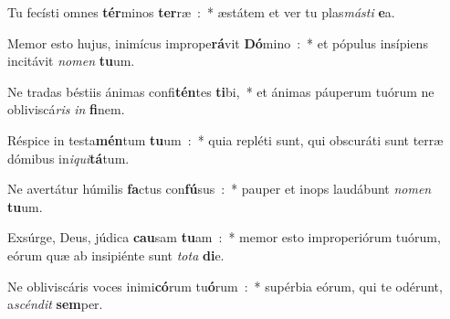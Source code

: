\item Tu fecísti omnes \textbf{tér}minos \textbf{ter}ræ~:~* æstátem et ver tu plas\emph{má}\emph{sti} \textbf{e}a.
\item Memor esto hujus, inimícus imprope\textbf{rá}vit \textbf{Dó}mino~:~* et pópulus insípiens incitávit \emph{no}\emph{men} \textbf{tu}um.
\item Ne tradas béstiis ánimas confi\textbf{tén}tes \textbf{ti}bi,~* et ánimas páuperum tuórum ne obliviscá\emph{ris} \emph{in} \textbf{fi}nem.
\item Réspice in testa\textbf{mén}tum \textbf{tu}um~:~* quia repléti sunt, qui obscuráti sunt terræ dómibus in\emph{i}\emph{qui}\textbf{tá}tum.\ifx\lalinebreakaftertwentyone\undefined\else\\\fi
\item Ne avertátur húmilis \textbf{fa}ctus con\textbf{fú}sus~:~* pauper et inops laudábunt \emph{no}\emph{men} \textbf{tu}um.
\item Exsúrge, Deus, júdica \textbf{cau}sam \textbf{tu}am~:~* memor esto improperiórum tuórum, eórum quæ ab insipiénte sunt \emph{to}\emph{ta} \textbf{di}e.
\item Ne obliviscáris voces inimi\textbf{có}rum tu\textbf{ó}rum~:~* supérbia eórum, qui te odérunt, a\emph{scén}\emph{dit} \textbf{sem}per.